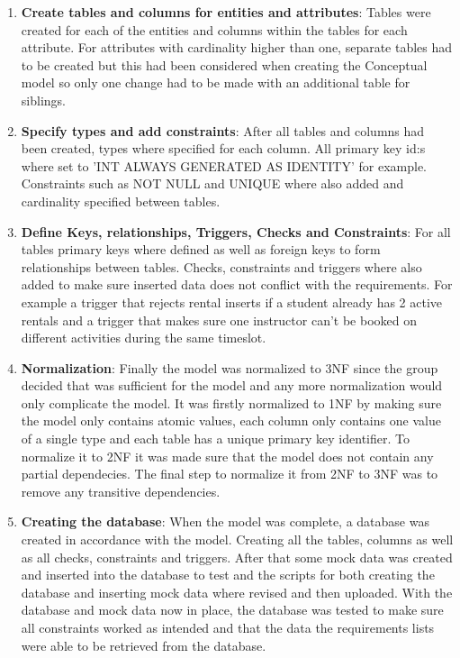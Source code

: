 \documentclass[a4paper]{scrartcl}
\begin{document}
\begin{enumerate}
    \item \textbf{Create tables and columns for entities and attributes}:
  Tables were created for each of the entities and columns within the tables for each attribute. For attributes with cardinality higher than one, separate tables had to be created but this had been considered when creating the Conceptual model so only one change had to be made with an additional table for siblings.

    \item \textbf{Specify types and add constraints}:
  After all tables and columns had been created, types where specified for each column. All primary key id:s where set to 'INT ALWAYS GENERATED AS IDENTITY' for example. Constraints such as NOT NULL and UNIQUE where also added and cardinality specified between tables.

    \item \textbf{Define Keys, relationships, Triggers, Checks and Constraints}:
  For all tables primary keys where defined as well as foreign keys to form relationships between tables. Checks, constraints and triggers where also added to make sure inserted data does not conflict with the requirements. For example a trigger that rejects rental inserts if a student already has 2 active rentals and a trigger that makes sure one instructor can't be booked on different activities during the same timeslot.

    \item \textbf{Normalization}:
  Finally the model was normalized to 3NF since the group decided that was sufficient for the model and any more normalization would only complicate the model. It was firstly normalized to 1NF by making sure the model only contains atomic values, each column only contains one value of a single type and each table has a unique primary key identifier. To normalize it to 2NF it was made sure that the model does not contain any partial dependecies. The final step to normalize it from 2NF to 3NF was to remove any transitive dependencies.

    \item \textbf{Creating the database}:
  When the model was complete, a database was created in accordance with the model. Creating all the tables, columns as well as all checks, constraints and triggers. After that some mock data was created and inserted into the database to test and the scripts for both creating the database and inserting mock data where revised and then uploaded. With the database and mock data now in place, the database was tested to make sure all constraints worked as intended and that the data the requirements lists were able to be retrieved from the database.

\end{enumerate}
\end{document}
